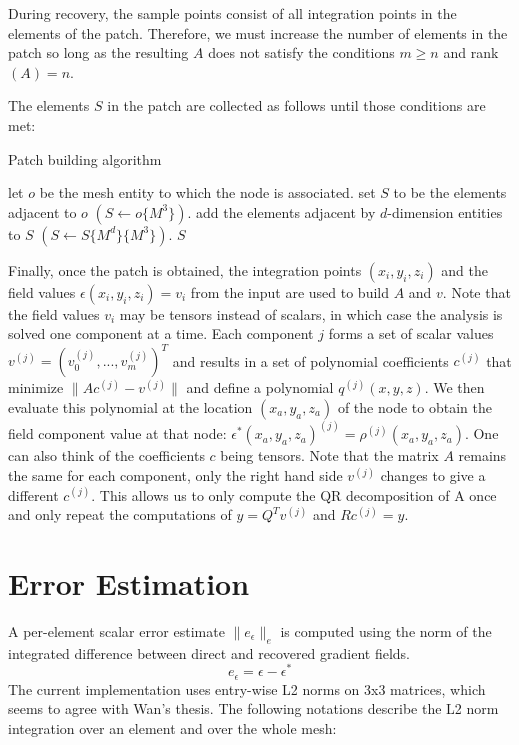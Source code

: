 \documentclass{article}
\begin{document}
During recovery, the sample points consist of all
integration points in the elements of the patch.
Therefore, we must increase the number of elements
in the patch so long as the resulting $A$ does
not satisfy the conditions $m \geq n$ and rank$(A) = n$.

The elements $S$ in the patch are collected as follows
until those conditions are met:

\begin{algorithm}
\caption{Patch building algorithm}
\begin{algorithmic}
\State let $o$ be the mesh entity to which the node is associated.
\State set $S$ to be the elements adjacent to $o$ $(S \gets o\{M^3\})$.
\Loop
{}
\State add the elements adjacent by $d$-dimension entities to $S$
$(S \gets S\{M^d\}\{M^3\})$.
\State \Return $S$
\EndIf
\EndFor
\EndLoop
\end{algorithmic}
\end{algorithm}

Finally, once the patch is obtained, the integration points
$(x_i,y_i,z_i)$ and the field values $\epsilon(x_i,y_i,z_i) = v_i$
from the input are used to build $A$ and $v$.
Note that the field values $v_i$ may be tensors instead of scalars,
in which case the analysis is solved one component at a time.
Each component $j$ forms a set of scalar values $v^{(j)} = (v_0^{(j)},...,v_m^{(j)})^T$
and results in a set of polynomial coefficients $c^{(j)}$
that minimize $\|Ac^{(j)} - v^{(j)}\|$ and define a polynomial $q^{(j)}(x,y,z)$.
We then evaluate this polynomial at the location $(x_a,y_a,z_a)$
of the node to obtain the field component value at
that node: $\epsilon^*(x_a,y_a,z_a)^{(j)} = \rho^{(j)}(x_a,y_a,z_a)$.
One can also think of the coefficients $c$ being
tensors.
Note that the matrix $A$ remains the same for each component,
only the right hand side $v^{(j)}$ changes to give a different
$c^{(j)}$. This allows us to only compute the QR decomposition
of A once and only repeat the computations of $y=Q^Tv^{(j)}$
and $Rc^{(j)}=y$.

\section{Error Estimation}

A per-element scalar error estimate
$\|e_\epsilon\|_e$ is computed using the
norm of the integrated difference between
direct and recovered gradient fields.
\[e_\epsilon=\epsilon - \epsilon^*\]
The current implementation uses entry-wise L2 norms on
3x3 matrices, which seems to agree with Wan's thesis.
The following notations describe the L2 norm integration
over an element and over the whole mesh:
\end{document}
